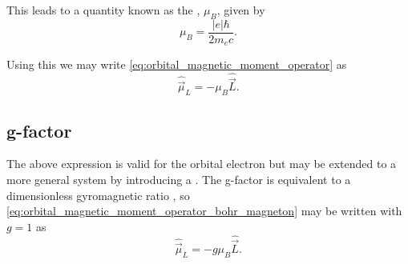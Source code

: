 This leads to a quantity known as the \textbf{}, $\mu_B$, given by \cite{Ramamurti1995-wg}
\begin{equation}
	\mu_B = \frac{|e|\hbar}{2m_e c}.
	\label{eq:bohr_magneton}
\end{equation}

Using this we may write \eqref{eq:orbital_magnetic_moment_operator} as
\begin{equation}
	\hat{\vec{\mu}}_L = -\mu_B\hat{\vec{L}}.
	\label{eq:orbital_magnetic_moment_operator_bohr_magneton}
\end{equation}


\subsection{g-factor}
The above expression is valid for the orbital electron but may be extended to a more general system by introducing a . The g-factor is equivalent to a dimensionless gyromagnetic ratio \cite{giancoli2008physics}, so \eqref{eq:orbital_magnetic_moment_operator_bohr_magneton} may be written with $g=1$ as
\begin{equation}
	\hat{\vec{\mu}}_L = -g\mu_B\hat{ \vec{L}}.
	\label{eq:orbital_magnetic_moment_operator_bohr_magneton_g_factor}
\end{equation}


